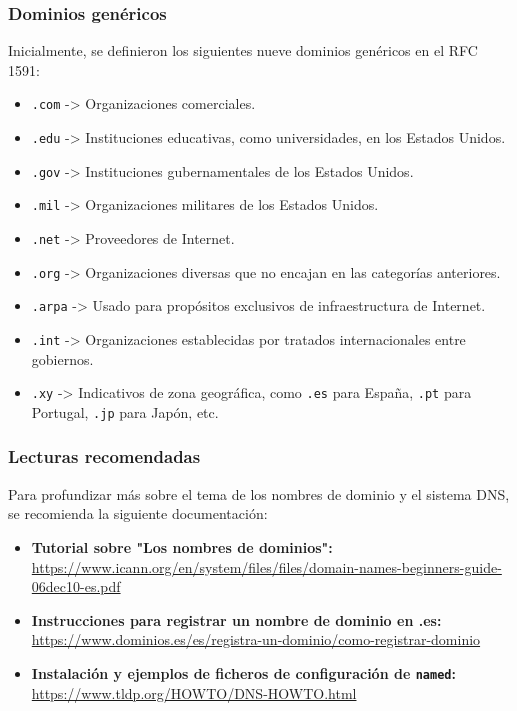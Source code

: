 \documentclass[a4paper,12pt]{article}
\begin{document}
\subsubsection{Dominios genéricos}

Inicialmente, se definieron los siguientes nueve dominios genéricos en el RFC 1591:

\begin{itemize}
    \item \texttt{.com} -> Organizaciones comerciales.
    \item \texttt{.edu} -> Instituciones educativas, como universidades, en los Estados Unidos.
    \item \texttt{.gov} -> Instituciones gubernamentales de los Estados Unidos.
    \item \texttt{.mil} -> Organizaciones militares de los Estados Unidos.
    \item \texttt{.net} -> Proveedores de Internet.
    \item \texttt{.org} -> Organizaciones diversas que no encajan en las categorías anteriores.
    \item \texttt{.arpa} -> Usado para propósitos exclusivos de infraestructura de Internet.
    \item \texttt{.int} -> Organizaciones establecidas por tratados internacionales entre gobiernos.
    \item \texttt{.xy} -> Indicativos de zona geográfica, como \texttt{.es} para España, \texttt{.pt} para Portugal, \texttt{.jp} para Japón, etc.
\end{itemize}

\subsubsection{Lecturas recomendadas}

Para profundizar más sobre el tema de los nombres de dominio y el sistema DNS, se recomienda la siguiente documentación:

\begin{itemize}
    \item \textbf{Tutorial sobre "Los nombres de dominios":} \url{https://www.icann.org/en/system/files/files/domain-names-beginners-guide-06dec10-es.pdf}
    \item \textbf{Instrucciones para registrar un nombre de dominio en .es:} \url{https://www.dominios.es/es/registra-un-dominio/como-registrar-dominio}
    \item \textbf{Instalación y ejemplos de ficheros de configuración de \texttt{named}:} \url{https://www.tldp.org/HOWTO/DNS-HOWTO.html}
\end{itemize}
\end{document}
